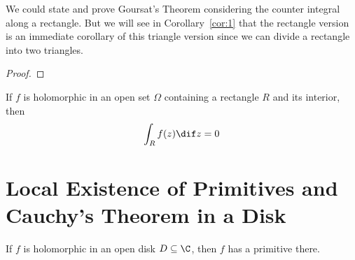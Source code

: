 \documentclass[thmcnt=section, color=cyan, 12pt]{my-elegantbook}
\begin{document}
We could state and prove Goursat's Theorem
considering the counter integral along a rectangle.
But we will see in Corollary~\ref{cor:1}
that the rectangle version is an immediate corollary of this triangle version
since we can divide a rectangle into two triangles.

\begin{proof}
\end{proof}

\begin{corollary} \label{cor:1}
	If $f$ is holomorphic in an open set $\Omega$
	containing a rectangle $R$ and its interior, then
	\begin{align*}
		\int_{R} f(z) \dif z = 0
	\end{align*}
\end{corollary}


\section{Local Existence of Primitives and Cauchy's Theorem in a Disk}

\begin{theorem}
	If $f$ is holomorphic in an open disk $D \subseteq \C$, then $f$ has a primitive there.
\end{theorem}
\end{document}
